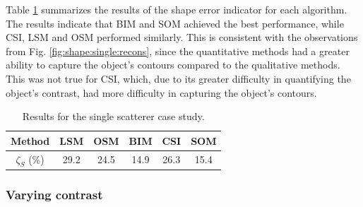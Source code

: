 \documentclass{IEEEtran}
\begin{document}
                Table \ref{tab:star} summarizes the results of the shape error indicator for each algorithm. The results indicate that BIM and SOM achieved the best performance, while CSI, LSM and OSM performed similarly. This is consistent with the observations from Fig. \ref{fig:shape:single:recons}, since the quantitative methods had a greater ability to capture the object's contours compared to the qualitative methods. This was not true for CSI, which, due to its greater difficulty in quantifying the object's contrast, had more difficulty in capturing the object's contours.           

                \begin{table}[!htb]
                    \centering
                    \renewcommand{\arraystretch}{1.5}
                    \caption{Results for the single scatterer case study.}
                    \label{tab:star}
                    \begin{tabular}{cccccc}
                        Method & LSM & OSM & BIM & CSI & SOM \\\hline
                        $\zeta_S$ (\%) & 29.2 & 24.5 & 14.9 & 26.3 & 15.4 \\
                    \end{tabular}   
                \end{table}
			
			\subsubsection{Varying contrast}\label{sec:results:shape:varying}

\end{document}
